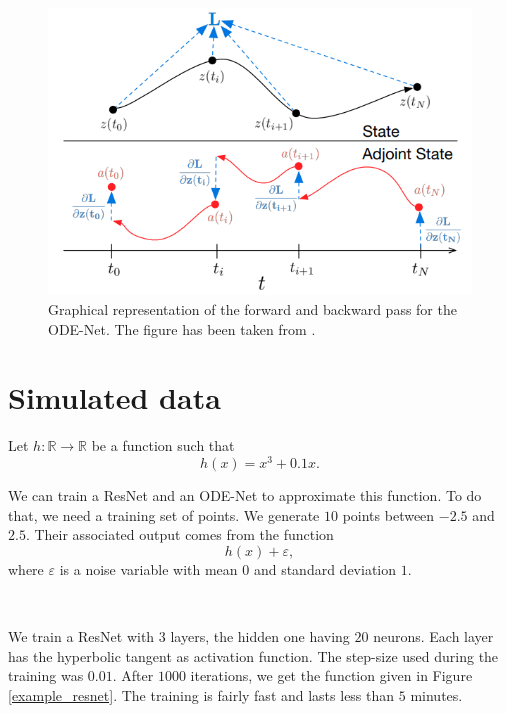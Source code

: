 \documentclass[10pt,a4paper]{article}
\theoremstyle{definition}
\theoremstyle{plain}
\begin{document}
\begin{figure}[!h]
\center
\includegraphics[scale=0.7]{fig2.png}
\caption{Graphical representation of the forward and backward pass for the ODE-Net. The figure has been taken from \cite{12}.}
\label{process}
\end{figure}

\section{Simulated data}

Let $h: \mathbb{R} \to \mathbb{R}$ be a function such that
$$
h(x) = x^3 + 0.1x.
$$

We can train a ResNet and an ODE-Net to approximate this function.
To do that, we need a training set of points. We generate $10$ points between $-2.5$ and $2.5$. Their associated output comes from the function
$$
h(x) + \varepsilon,
$$
where $\varepsilon$ is a noise variable with mean $0$ and standard deviation $1$.

~

We train a ResNet with $3$ layers, the hidden one having $20$ neurons. Each layer has the hyperbolic tangent as activation function. The step-size used during the training was $0.01$. After $1000$ iterations, we get the function given in Figure \ref{example_resnet}. The training is fairly fast and lasts less than $5$ minutes.
\end{document}
